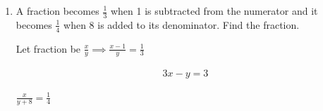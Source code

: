 \begin{enumerate}[label=\thesubsection.\arabic*, ref=\thesubsection.\theenumi]
\begin{center}
	\end{center}
	
	\solution
	
	$AB = CD =12cm $ and $AD = BC = 6\sqrt{2}cm $
	
	area of shaded region = area of parallelogram - area of quarter circle 
	
	$r= 6 cm , \text{area of quarter circle }= \frac{1}{4}\pi r^2 = 9\pi cm^2 $
	
	$\text{area of parallelogram } = b.h ;\text{b= length of base }$
	
	$\text{h= perpendicular length from base to opposite side }$
	
	area of paralellogram = $12*6= 72cm^2$
	
	area of shaded region $=72-9\pi  cm^2= 43.725cm ^2$
	
	\item  A fraction becomes $\frac{1}{3}$ when 1 is subtracted from the numerator and it becomes $\frac{1}{4}$ when 8 is added to its denominator. Find the fraction.  
	
	\solution
	
	Let fraction be $\frac{x}{y} \implies \frac{x-1}{y}=\frac{1}{3}$
	
	\begin{align}
		3x-y=3  
	\end{align}
	
	$\frac{x}{y+8}=\frac{1}{4} $
	

\end{enumerate}
